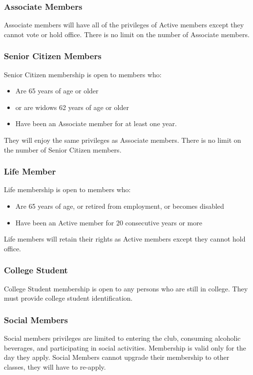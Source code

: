 \documentclass[12pt,letterpaper]{article}
\begin{document}
\subsubsection{Associate Members}
Associate members will have all of the privileges of Active members except they cannot vote or hold office. There is no limit on the number of Associate members. 

\subsubsection{Senior Citizen Members}
Senior Citizen membership is open to members who:
\begin{itemize}
\item Are 65 years of age or older 
\item or are widows 62 years of age or older
\item Have been an Associate member for at least one year. 
\end{itemize}

They will enjoy the same privileges as Associate members. There is no limit on the number of Senior Citizen members.

\subsubsection{Life Member}
Life membership is open to members who:
\begin{itemize}
\item Are 65 years of age, or retired from employment, or becomes disabled
\item Have been an Active member for 20 consecutive years or more
\end{itemize}
Life members will retain their rights as Active members except they cannot hold office. 

\subsubsection{College Student}
College Student membership is open to any persons who are still in college. They must provide college student identification. %

\subsubsection{Social Members}
Social members privileges are limited to entering the club, consuming alcoholic beverages, and participating in social activities. Membership is valid only for the day they apply. Social Members cannot upgrade their membership to other classes, they will have to re-apply.
\end{document}
